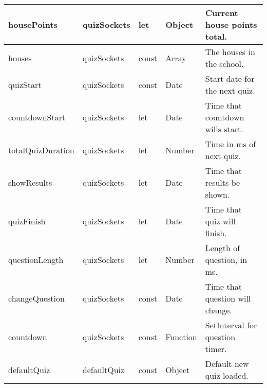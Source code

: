 \begin{longtable}{|l|l|l|l|l|}
housePoints                         & quizSockets                          & let                                & Object                               & Current house points total.           \\ \hline
houses                              & quizSockets                          & const                              & Array                                & The houses in the school.             \\ \hline
quizStart                           & quizSockets                          & const                              & Date                                 & Start date for the next quiz.         \\ \hline
countdownStart                      & quizSockets                          & let                                & Date                                 & Time that countdown wills start.      \\ \hline
totalQuizDuration                   & quizSockets                          & let                                & Number                               & Time in ms of next quiz.              \\ \hline
showResults                         & quizSockets                          & let                                & Date                                 & Time that results be shown.           \\ \hline
quizFinish                          & quizSockets                          & let                                & Date                                 & Time that quiz will finish.           \\ \hline
questionLength                      & quizSockets                          & let                                & Number                               & Length of question, in ms.            \\ \hline
changeQuestion                      & quizSockets                          & const                              & Date                                 & Time that question will change.       \\ \hline
countdown                           & quizSockets                          & const                              & Function                             & SetInterval for question timer.       \\ \hline
defaultQuiz                         & defaultQuiz                          & const                              & Object                               & Default new quiz loaded.              \\ \hline

\end{longtable}
